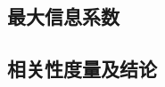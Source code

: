 \documentclass[cs4size,a4paper]{ctexart}
\numberwithin{equation}{section}
\numberwithin{table}{section}
\numberwithin{figure}{section}
\newcommand{\upcite}[1]{\textsuperscript{\textsuperscript{\cite{#1}}}}%
\begin{document}



\subsection{最大信息系数}




\subsection{相关性度量及结论}~\label{subsec:sum}


\end{document}
